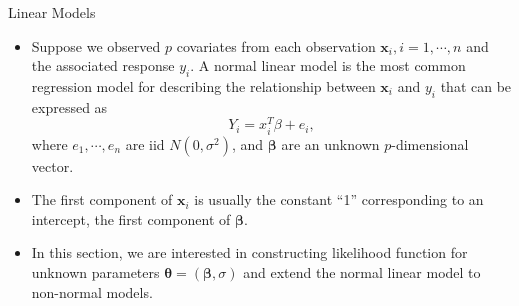 \documentclass{beamer}
\begin{document}
    
\begin{frame}{Linear Models}
        \begin{itemize}
            \item Suppose we observed $p$ covariates from each observation $\mathbf{x}_{i}, i = 1, \cdots, n$ and the associated response $y_{i}$. A normal linear model is the most common regression model for describing the relationship between $\mathbf{x}_{i}$ and $y_{i}$ that can be expressed as 
            \begin{equation}
               Y_{i} = x^{T}_{i}\beta + e_{i}, \label{eq: normalM}
            \end{equation}
            where $e_{1}, \cdots, e_{n}$ are iid $N(0, \sigma^2)$, and $\boldsymbol{\beta}$ are an unknown $p$-dimensional vector.
            \item The first component of $\mathbf{x}_{i}$ is usually the constant “1” corresponding to an intercept, the first component of $\boldsymbol{\beta}$.
            \item In this section, we are interested in constructing likelihood function for unknown parameters $\boldsymbol{\theta} = (\boldsymbol{\beta}, \sigma)$ and extend the normal linear model to non-normal models.
        \end{itemize}
    \end{frame}
\end{document}
